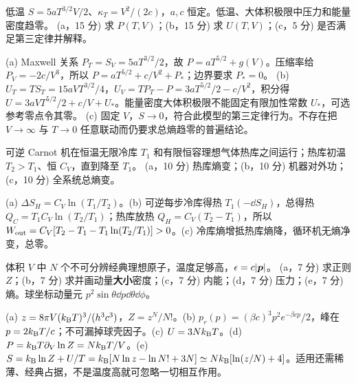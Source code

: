 \begin{exercise}
低温 $S=5aT^{3/2}V/2$、$\kappa_T=V^2/(2c)$，$a,c$ 恒定。低温、大体积极限中压力和能量密度趋零。
(a，15 分) 求 $P(T,V)$；(b，15 分) 求 $U(T,V)$；(c，5 分) 是否满足第三定律并解释。
\end{exercise}
\begin{solution}
(a) Maxwell 关系 $P_T=S_V=5aT^{3/2}/2$，故 $P=aT^{5/2}+g(V)$。压缩率给 $P_V=-2c/V^3$，所以 $P=aT^{5/2}+c/V^2+P_*$；边界要求 $P_*=0$。
(b) $U_T=TS_T=15aVT^{3/2}/4$，$U_V=TP_T-P=3aT^{5/2}/2-c/V^2$，积分得 $U=3aVT^{5/2}/2+c/V+U_*$。能量密度大体积极限不能固定有限加性常数 $U_*$，可选参考零点令其零。
(c) 固定 $V$，$S\to0$，符合此模型的第三定律行为。不存在把 $V\to\infty$ 与 $T\to0$ 任意联动而仍要求总熵趋零的普遍结论。
\end{solution}
\begin{exercise}
可逆 Carnot 机在恒温无限冷库 $T_1$ 和有限恒容理想气体热库之间运行；热库初温 $T_2>T_1$、恒 $C_V$，直到降至 $T_1$。
(a，10 分) 热库熵变；(b，10 分) 机器对外功；(c，10 分) 全系统总熵变。
\end{exercise}
\begin{solution}
(a) $\Delta S_H=C_V\ln(T_1/T_2)$。(b) 可逆每步冷库得热 $T_1(-\dd S_H)$，总得热 $Q_C=T_1C_V\ln(T_2/T_1)$；热库放热 $Q_H=C_V(T_2-T_1)$，所以 $W_{\rm out}=C_V[T_2-T_1-T_1\ln(T_2/T_1)]>0$。(c) 冷库熵增抵热库熵降，循环机无熵净变，总零。
\end{solution}
\begin{exercise}
体积 $V$ 中 $N$ 个不可分辨经典理想原子，温度足够高，$\epsilon=c|\boldsymbol{p}|$。
(a，7 分) 求正则 $Z$；(b，7 分) 求并画动量\textbf{大小}密度；(c，7 分) 内能；(d，7 分) 压力；(e，7 分) 熵。球坐标动量元 $p^2\sin\theta\dd p\dd\theta\dd\phi$。
\end{exercise}
\begin{solution}
(a) $z=8\pi V(k_{\mathrm B} T)^3/(h^3c^3)$，$Z=z^N/N!$。(b) $p_r(p)=(\beta c)^3p^2e^{-\beta cp}/2$，峰在 $p=2k_{\mathrm B} T/c$；不可漏掉球壳因子。(c) $U=3Nk_{\mathrm B} T$。(d) $P=k_{\mathrm B} T\partial_V\ln Z=Nk_{\mathrm B} T/V$。(e) $S=k_{\mathrm B}\ln Z+U/T=k_{\mathrm B}[N\ln z-\ln N!+3N]\simeq Nk_{\mathrm B}[\ln(z/N)+4]$。适用还需稀薄、经典占据，不是温度高就可忽略一切相互作用。
\end{solution}
\begin{center}\end{center}
